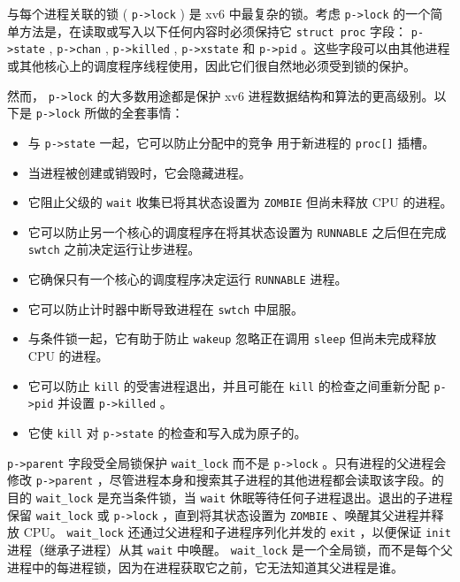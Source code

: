 \documentclass[UTF8]{article}
\begin{document}
{与每个进程关联的锁 (    \lstinline{p->lock}    ) 是 xv6 中最复杂的锁。考虑    \lstinline{p->lock}    的一个简单方法是，在读取或写入以下任何内容时必须保持它
    \lstinline{struct proc}    字段：
    \lstinline{p->state}    ,
    \lstinline{p->chan}    ,
    \lstinline{p->killed}    ,
    \lstinline{p->xstate}    和
    \lstinline{p->pid}   。这些字段可以由其他进程或其他核心上的调度程序线程使用，因此它们很自然地必须受到锁的保护。  

然而，   \lstinline{p->lock}    的大多数用途都是保护 xv6 进程数据结构和算法的更高级别。以下是    \lstinline{p->lock}    所做的全套事情：  

   \begin{itemize}


   \item   与    \lstinline{p->state}    一起，它可以防止分配中的竞争
 用于新进程的    \lstinline{proc[]}    插槽。   \item   当进程被创建或销毁时，它会隐藏进程。   \item   它阻止父级的    \lstinline{wait}    收集已将其状态设置为    \lstinline{ZOMBIE}    但尚未释放 CPU 的进程。   \item   它可以防止另一个核心的调度程序在将其状态设置为    \lstinline{RUNNABLE}    之后但在完成    \lstinline{swtch}    之前决定运行让步进程。   \item   它确保只有一个核心的调度程序决定运行
    \lstinline{RUNNABLE}    进程。   \item   它可以防止计时器中断导致进程在    \lstinline{swtch}    中屈服。   \item   与条件锁一起，它有助于防止    \lstinline{wakeup}    忽略正在调用    \lstinline{sleep}    但尚未完成释放 CPU 的进程。   \item   它可以防止    \lstinline{kill}    的受害进程退出，并且可能在    \lstinline{kill}    的检查之间重新分配
    \lstinline{p->pid}    并设置    \lstinline{p->killed}    。   \item   它使    \lstinline{kill}    对    \lstinline{p->state}    的检查和写入成为原子的。  \end{itemize}     

   \lstinline{p->parent}    字段受全局锁保护
    \lstinline{wait_lock}    而不是    \lstinline{p->lock}    。只有进程的父进程会修改    \lstinline{p->parent}    ，尽管进程本身和搜索其子进程的其他进程都会读取该字段。的目的
    \lstinline{wait_lock}    是充当条件锁，当
    \lstinline{wait}    休眠等待任何子进程退出。退出的子进程保留    \lstinline{wait_lock}    或    \lstinline{p->lock}    ，直到将其状态设置为    \lstinline{ZOMBIE}    、唤醒其父进程并释放 CPU。    \lstinline{wait_lock}    还通过父进程和子进程序列化并发的    \lstinline{exit}    ，以便保证    \lstinline{init}    进程（继承子进程）从其    \lstinline{wait}    中唤醒。
    \lstinline{wait_lock}    是一个全局锁，而不是每个父进程中的每进程锁，因为在进程获取它之前，它无法知道其父进程是谁。
}
\end{document}
